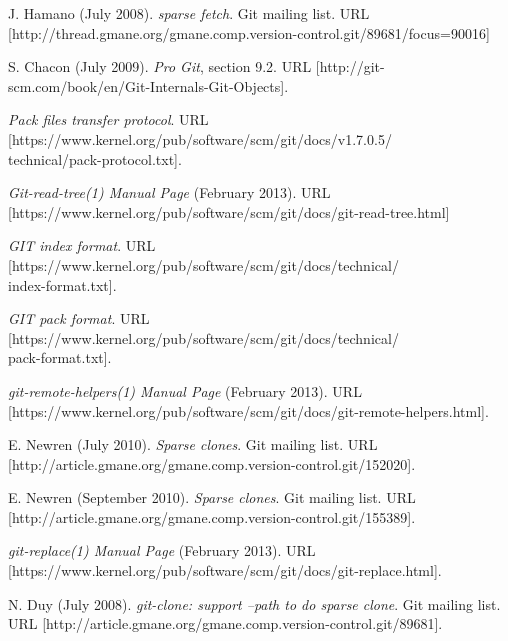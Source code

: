 \documentclass[copyrightwanted=false]{sigplanconf}
\begin{document}
\begin{thebibliography}{10}
    \softraggedright

     J. Hamano (July 2008).
    \newblock \emph{sparse fetch}.
    \newblock Git mailing list.
    \newblock URL
    [http://thread.gmane.org/gmane.comp.version-control.git/89681/focus=90016]

     S. Chacon (July 2009).
    \newblock\emph{Pro Git}, section 9.2.
    \newblock URL
    [http://git-scm.com/book/en/Git-Internals-Git-Objects].

     \emph{Pack files transfer protocol}.
    \newblock URL
    [https://www.kernel.org/pub/software/scm/git/docs/v1.7.0.5/\\
      technical/pack-protocol.txt].

     \emph{Git-read-tree(1) Manual Page} (February 2013).
    \newblock URL
    [https://www.kernel.org/pub/software/scm/git/docs/git-read-tree.html]

     \emph{GIT index format}.
    \newblock URL
    [https://www.kernel.org/pub/software/scm/git/docs/technical/\\
    index-format.txt].

     \emph{GIT pack format}.
    \newblock URL
    [https://www.kernel.org/pub/software/scm/git/docs/technical/\\
    pack-format.txt].

     \emph{git-remote-helpers(1) Manual Page}
        (February 2013).
    \newblock URL
    [https://www.kernel.org/pub/software/scm/git/docs/git-remote-helpers.html].

    E. Newren (July 2010).
    \newblock \emph{Sparse clones}.
    \newblock Git mailing list.
    \newblock URL
    [http://article.gmane.org/gmane.comp.version-control.git/152020].

    E. Newren (September 2010).
    \newblock \emph{Sparse clones}.
    \newblock Git mailing list.
    \newblock URL
    [http://article.gmane.org/gmane.comp.version-control.git/155389].

     \emph{git-replace(1) Manual Page} (February 2013).
    \newblock URL
    [https://www.kernel.org/pub/software/scm/git/docs/git-replace.html].

    N. Duy (July 2008).
    \newblock \emph{git-clone: support --path to do sparse clone}.
    \newblock Git mailing list.
    \newblock URL
    [http://article.gmane.org/gmane.comp.version-control.git/89681].


\end{thebibliography}
\end{document}
